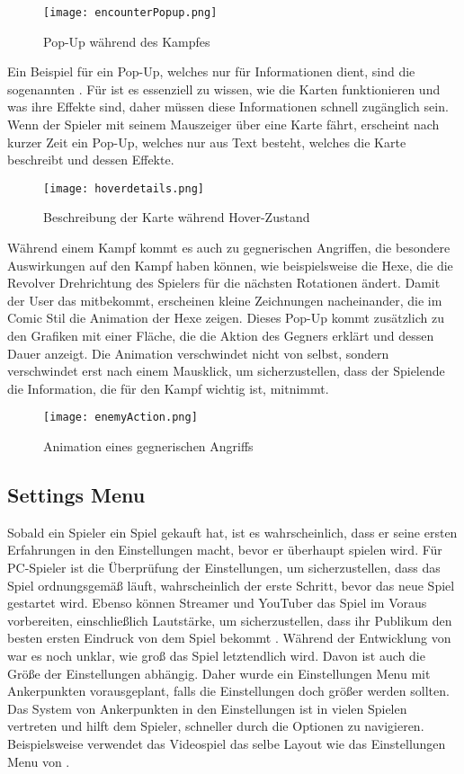 \begin{figure}[H]
    \centering
    \texttt{[image: encounterPopup.png]}
    \caption{Pop-Up während des Kampfes}
\end{figure}

Ein Beispiel für ein Pop-Up, welches nur für Informationen dient, sind die sogenannten . Für \FF ist es essenziell zu wissen, wie die Karten funktionieren und was ihre Effekte sind, daher müssen diese Informationen schnell zugänglich sein. Wenn der Spieler mit seinem Mauszeiger über eine Karte fährt, erscheint nach kurzer Zeit ein Pop-Up, welches nur aus Text besteht, welches die Karte beschreibt und dessen Effekte.

\begin{figure}[H]
    \centering
    \texttt{[image: hoverdetails.png]}
    \caption{Beschreibung der Karte während Hover-Zustand}
\end{figure}

Während einem Kampf kommt es auch zu gegnerischen Angriffen, die besondere Auswirkungen auf den Kampf haben können, wie beispielsweise die Hexe, die die Revolver Drehrichtung des Spielers für die nächsten  Rotationen ändert. Damit der User das mitbekommt, erscheinen kleine Zeichnungen nacheinander, die im Comic Stil die Animation der Hexe zeigen. Dieses Pop-Up kommt zusätzlich zu den Grafiken mit einer Fläche, die die Aktion des Gegners erklärt und dessen Dauer anzeigt. Die Animation verschwindet nicht von selbst, sondern verschwindet erst nach einem Mausklick, um sicherzustellen, dass der Spielende die Information, die für den Kampf wichtig ist, mitnimmt.

\begin{figure}[H]
    \centering
    \texttt{[image: enemyAction.png]}
    \caption{Animation eines gegnerischen Angriffs}
\end{figure}

\subsection{Settings Menu}

Sobald ein Spieler ein Spiel gekauft hat, ist es wahrscheinlich, dass er seine ersten Erfahrungen in den
Einstellungen macht, bevor er überhaupt spielen wird. Für PC-Spieler ist die Überprüfung der Einstellungen, um
sicherzustellen, dass das Spiel ordnungsgemäß läuft, wahrscheinlich der erste Schritt, bevor das neue Spiel gestartet
wird. Ebenso können Streamer und YouTuber das Spiel im Voraus vorbereiten, einschließlich Lautstärke, um
sicherzustellen, dass ihr Publikum den besten ersten Eindruck von dem Spiel bekommt . Während
der Entwicklung
von \FF war es noch unklar, wie groß das Spiel letztendlich wird. Davon ist auch die Größe der Einstellungen abhängig. Daher wurde ein Einstellungen Menu mit Ankerpunkten vorausgeplant, falls die Einstellungen doch größer werden sollten. Das System von Ankerpunkten in den Einstellungen ist in vielen Spielen vertreten und hilft dem Spieler, schneller durch die Optionen zu navigieren. Beispielsweise verwendet das Videospiel  das selbe Layout wie das Einstellungen Menu von \FF.

